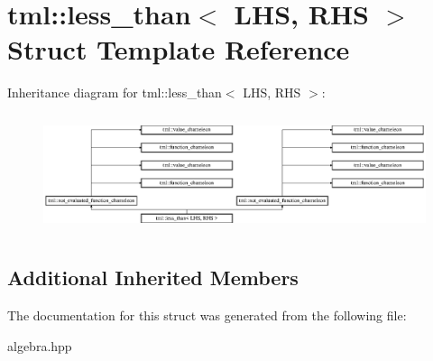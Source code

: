 \hypertarget{structtml_1_1less__than}{\section{tml\+:\+:less\+\_\+than$<$ L\+H\+S, R\+H\+S $>$ Struct Template Reference}
\label{structtml_1_1less__than}
}
Inheritance diagram for tml\+:\+:less\+\_\+than$<$ L\+H\+S, R\+H\+S $>$\+:\begin{figure}[H]
\begin{center}
\leavevmode
\includegraphics[height=3.500000cm]{structtml_1_1less__than}
\end{center}
\end{figure}
\subsection*{Additional Inherited Members}


The documentation for this struct was generated from the following file\+:\begin{DoxyCompactItemize}
\item 
algebra.\+hpp\end{DoxyCompactItemize}
